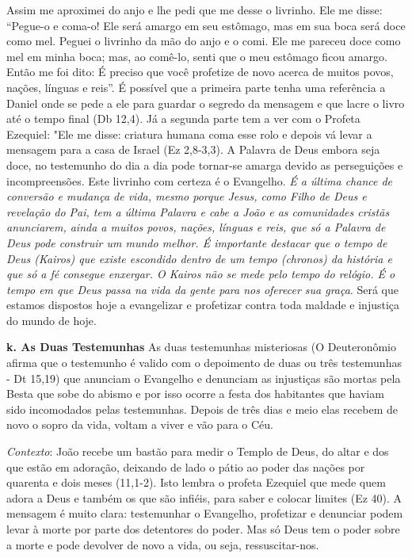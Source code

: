 \documentclass[
]{book}
\begin{document}
Assim me aproximei do anjo e lhe pedi que me desse o livrinho. Ele me disse: ``Pegue-o e coma-o! Ele será amargo em seu estômago, mas em sua boca será doce como mel. Peguei o livrinho da mão do anjo e o comi. Ele me pareceu doce como mel em minha boca; mas, ao comê-lo, senti que o meu estômago ficou amargo. Então me foi dito: É preciso que você profetize de novo acerca de muitos povos, nações, línguas e reis''. É possível que a primeira parte tenha uma referência a Daniel onde se pede a ele para guardar o segredo da mensagem e que lacre o livro até o tempo final (Db 12,4). Já a segunda parte tem a ver com o Profeta Ezequiel: "Ele me disse: criatura humana coma esse rolo e depois vá levar a mensagem para a casa de Israel (Ez 2,8-3,3). A Palavra de Deus embora seja doce, no testemunho do dia a dia pode tornar-se amarga devido as perseguições e incompreensões. Este livrinho com certeza é o Evangelho. \emph{É a última chance de conversão e mudança de vida, mesmo porque Jesus, como Filho de Deus e revelação do Pai, tem a última Palavra e cabe a João e as comunidades cristãs anunciarem, ainda a muitos povos, nações, línguas e reis, que só a Palavra de Deus pode construir um mundo melhor. É importante destacar que o tempo de Deus (Kairos) que existe escondido dentro de um tempo (chronos) da história e que só a fé consegue enxergar. O Kairos não se mede pelo tempo do relógio. É o tempo em que Deus passa na vida da gente para nos oferecer sua graça}. Será que estamos dispostos hoje a evangelizar e profetizar contra toda maldade e injustiça do mundo de hoje.

\textbf{k. As Duas Testemunhas}
As duas testemunhas misteriosas (O Deuteronômio afirma que o testemunho é valido com o depoimento de duas ou três testemunhas - Dt 15,19) que anunciam o Evangelho e denunciam as injustiças são mortas pela Besta que sobe do abismo e por isso ocorre a festa dos habitantes que haviam sido incomodados pelas testemunhas. Depois de três dias e meio elas recebem de novo o sopro da vida, voltam a viver e vão para o Céu.

\emph{Contexto}: João recebe um bastão para medir o Templo de Deus, do altar e dos que estão em adoração, deixando de lado o pátio ao poder das nações por quarenta e dois meses (11,1-2). Isto lembra o profeta Ezequiel que mede quem adora a Deus e também os que são infiéis, para saber e colocar limites (Ez 40). A mensagem é muito clara: testemunhar o Evangelho, profetizar e denunciar podem levar à morte por parte dos detentores do poder. Mas só Deus tem o poder sobre a morte e pode devolver de novo a vida, ou seja, ressuscitar-nos.
\end{document}
